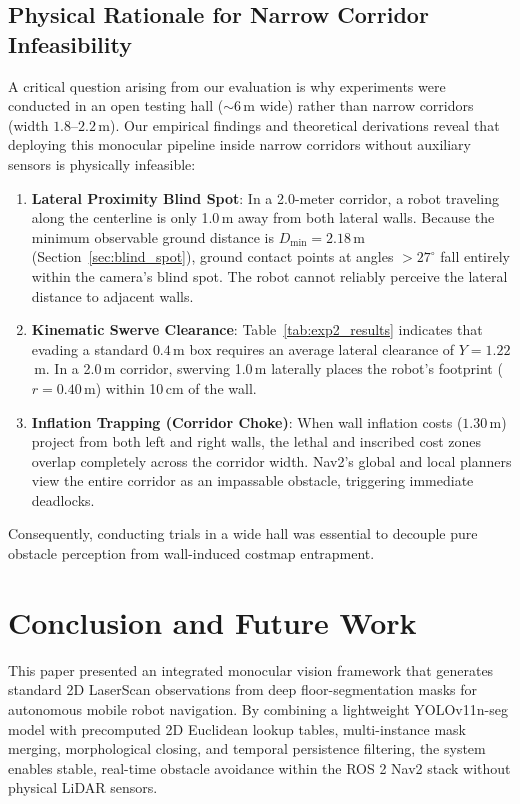 \documentclass{ieeeaccess}
\begin{document}
\subsection{Physical Rationale for Narrow Corridor Infeasibility}
\label{subsec:corridor_limitations}
A critical question arising from our evaluation is why experiments were conducted in an open testing hall ($\sim 6$\,m wide) rather than narrow corridors (width $1.8\text{--}2.2$\,m). Our empirical findings and theoretical derivations reveal that deploying this monocular pipeline inside narrow corridors without auxiliary sensors is physically infeasible:

\begin{enumerate}
  \item \textbf{Lateral Proximity Blind Spot}: In a 2.0-meter corridor, a robot traveling along the centerline is only 1.0\,m away from both lateral walls. Because the minimum observable ground distance is $D_{\min} = 2.18$\,m (Section~\ref{sec:blind_spot}), ground contact points at angles $> 27^\circ$ fall entirely within the camera's blind spot. The robot cannot reliably perceive the lateral distance to adjacent walls.
  \item \textbf{Kinematic Swerve Clearance}: Table~\ref{tab:exp2_results} indicates that evading a standard $0.4$\,m box requires an average lateral clearance of $Y = 1.22$\,m. In a 2.0\,m corridor, swerving 1.0\,m laterally places the robot's footprint ($r=0.40$\,m) within 10\,cm of the wall.
  \item \textbf{Inflation Trapping (Corridor Choke)}: When wall inflation costs ($1.30$\,m) project from both left and right walls, the lethal and inscribed cost zones overlap completely across the corridor width. Nav2's global and local planners view the entire corridor as an impassable obstacle, triggering immediate deadlocks.
\end{enumerate}
Consequently, conducting trials in a wide hall was essential to decouple pure obstacle perception from wall-induced costmap entrapment.

\section{Conclusion and Future Work}
\label{sec:conclusion}

This paper presented an integrated monocular vision framework that generates standard 2D LaserScan observations from deep floor-segmentation masks for autonomous mobile robot navigation. By combining a lightweight YOLOv11n-seg model with precomputed 2D Euclidean lookup tables, multi-instance mask merging, morphological closing, and temporal persistence filtering, the system enables stable, real-time obstacle avoidance within the ROS 2 Nav2 stack without physical LiDAR sensors. 
\end{document}
